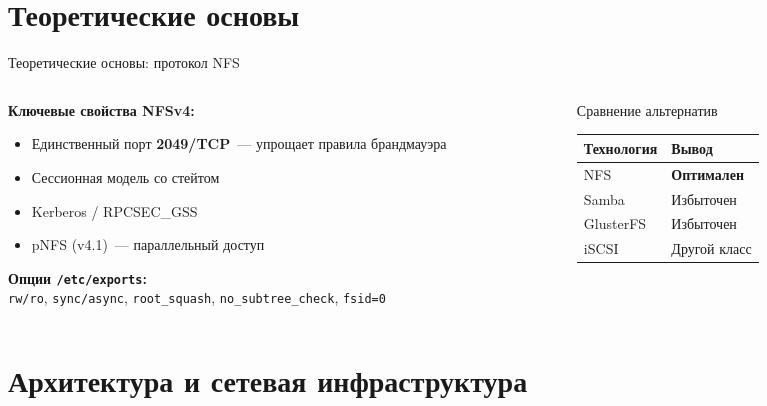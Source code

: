 \documentclass[aspectratio=169,14pt]{beamer}
\begin{document}
	\section{Теоретические основы}
	
	\begin{frame}{Теоретические основы: протокол NFS}
		\begin{columns}[T]
			\begin{column}{0.55\textwidth}
				\textbf{Ключевые свойства NFSv4:}
				\begin{itemize}\small
					\item Единственный порт \textbf{2049/TCP}~— упрощает правила брандмауэра
					\item Сессионная модель со стейтом
					\item Kerberos / RPCSEC\_GSS
					\item pNFS (v4.1)~— параллельный доступ
				\end{itemize}
				\vspace{0.3em}
				\textbf{Опции \texttt{/etc/exports}:}\\[2pt]
				\footnotesize\texttt{rw/ro}, \texttt{sync/async}, \texttt{root\_squash}, \texttt{no\_subtree\_check}, \texttt{fsid=0}
			\end{column}
			\begin{column}{0.43\textwidth}
				\begin{block}{Сравнение альтернатив}
					\small
					\begin{tabular}{ll}
						\toprule
						\textbf{Технология} & \textbf{Вывод} \\
						\midrule
						NFS   & \textcolor{accent!70!black}{\textbf{Оптимален}} \\
						Samba & Избыточен \\
						GlusterFS & Избыточен \\
						iSCSI & Другой класс \\
						\bottomrule
					\end{tabular}
				\end{block}
			\end{column}
		\end{columns}
	\end{frame}
	
	\section{Архитектура и сетевая инфраструктура}
	
\end{document}
